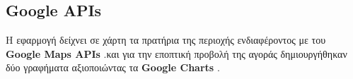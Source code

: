 \subsection{Google APIs}
Η εφαρμογή δείχνει σε χάρτη τα πρατήρια της περιοχής ενδιαφέροντος με του \textbf{Google Maps APIs} \cite{google-map}.και για την εποπτική προβολή της αγοράς δημιουργήθηκαν δύο γραφήματα αξιοποιώντας τα \textbf{Google Charts} \cite{google-chart}.